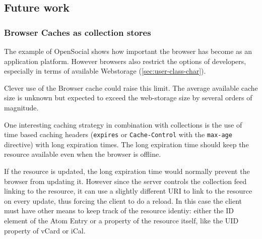 \documentclass[11pt,a4paper,headsepline,twoside]{scrartcl}		%
\begin{document}






\subsection{Future work}
\label{sec:further-work}





\subsubsection{Browser Caches as collection stores}
\label{sec:browser-caches-as}

The example of OpenSocial shows how important the browser has become as an
application platform. However browsers also restrict the options of developers,
especially in terms of available Webstorage (\autoref{sec:user-class-char}).

Clever use of the Browser cache could raise this limit. The average available
cache size is unknown but expected to exceed the web-storage size by several
orders of magnitude.

One interesting caching strategy in combination with collections is the use of
time based caching headers (\lstinline:expires: or \lstinline:Cache-Control:
with the \lstinline:max-age: directive) with long expiration times. The long
expiration time should keep the resource available even when the browser is
offline.

If the resource is updated, the long expiration time would normally prevent the
browser from updating it. However since the server controls the collection feed
linking to the resource, it can use a slightly different URI to link to the
resource on every update, thus forcing the client to do a reload. In this case
the client must have other means to keep track of the resource identiy: either
the ID element of the Atom Entry or a property of the resource itself, like the
UID property of vCard or iCal.
\end{document}
